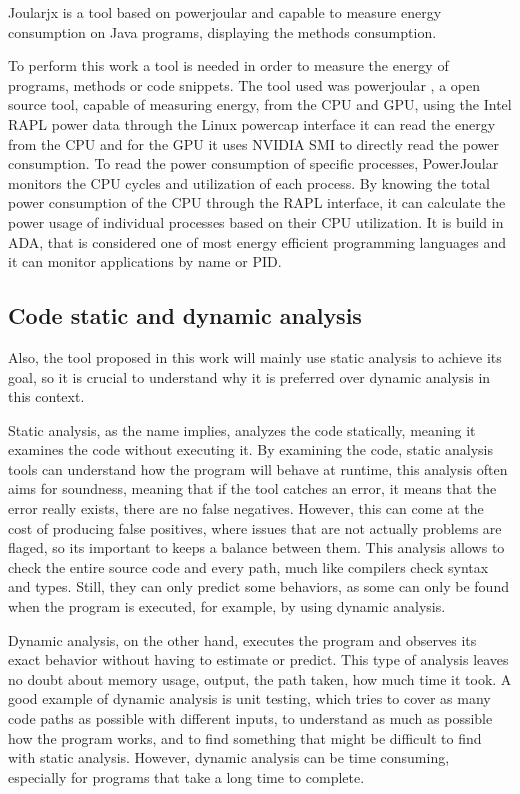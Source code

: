 \documentclass[sigplan]{acmart}
\begin{document}
Joularjx is a tool based on powerjoular and capable to measure energy consumption on Java programs, displaying the methods consumption.

To perform this work a tool is needed in order to measure the energy of programs, methods or code snippets. The tool used was powerjoular \cite{noureddine-ie-2022}, a open source tool, capable of measuring energy, from the CPU and GPU, using the Intel RAPL power data through the Linux powercap interface it can read the energy from the CPU and for the GPU it uses NVIDIA SMI to directly read the power consumption.
To read the power consumption of specific processes, PowerJoular monitors the CPU cycles and utilization of each process. By knowing the total power consumption of the CPU through the RAPL interface, it can calculate the power usage of individual processes based on their CPU utilization.
It is build in ADA, that is considered one of most energy efficient programming languages and it can monitor applications by name or PID.


\subsection{Code static and dynamic analysis} \label{sec:background_static_dynamic_analysis}
Also, the tool proposed in this work will mainly use static analysis to achieve its goal, so it is crucial to understand why it is preferred over dynamic analysis in this context.

Static analysis, as the name implies, analyzes the code statically, meaning it examines the code without executing it. By examining the code, static analysis tools can understand how the program will behave at runtime\cite{ernst2003static}, this analysis often aims for soundness, meaning that if the tool catches an error, it means that the error really exists, there are no false negatives. However, this can come at the cost of producing false positives, where issues that are not actually problems are flaged, so its important to keeps a balance between them. This analysis allows to check the entire source code and every path, much like compilers check syntax and types. Still, they can only predict some behaviors, as some can only be found when the program is executed, for example, by using dynamic analysis.

Dynamic analysis, on the other hand, executes the program and observes its exact behavior without having to estimate or predict. This type of analysis leaves no doubt about memory usage, output, the path taken, how much time it took\cite{ernst2003static}. A good example of dynamic analysis is unit testing, which tries to cover as many code paths as possible with different inputs, to understand as much as possible how the program works, and to find something that might be difficult to find with static analysis. However, dynamic analysis can be time consuming, especially for programs that take a long time to complete.
\end{document}
